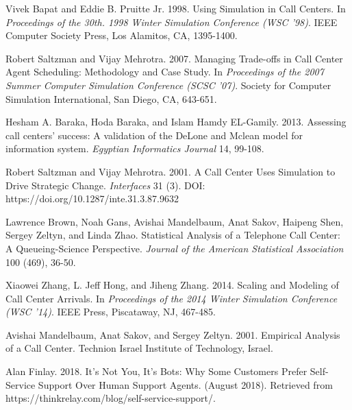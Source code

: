 \documentclass[12pt,twocolumn]{article}
\begin{document}
\newpage
\clearpage
{}
\begin{thebibliography}{8}
	
Vivek Bapat and Eddie B. Pruitte Jr. 1998. Using Simulation in Call Centers. In \textit{Proceedings of the 30th.  1998 Winter Simulation Conference (WSC ’98)}. IEEE Computer Society Press, Los Alamitos, CA, 1395-1400.

Robert Saltzman and Vijay Mehrotra. 2007. Managing Trade-offs in Call Center Agent Scheduling: Methodology and Case Study. In \textit{Proceedings of the 2007 Summer Computer Simulation Conference (SCSC ’07)}. Society for Computer Simulation International, San Diego, CA, 643-651.

Hesham A. Baraka, Hoda Baraka, and Islam Hamdy EL-Gamily. 2013. Assessing call centers’ success: A validation of the DeLone and Mclean model for information system. \textit{Egyptian Informatics Journal} 14, 99-108.

Robert Saltzman and Vijay Mehrotra. 2001. A Call Center Uses Simulation to Drive Strategic Change. \textit{Interfaces} 31 (3). DOI: https://doi.org/10.1287/inte.31.3.87.9632


Lawrence Brown, Noah Gans, Avishai Mandelbaum, Anat Sakov, Haipeng Shen, Sergey Zeltyn, and Linda Zhao. Statistical Analysis of a Telephone Call Center: A Queueing-Science Perspective. \textit{Journal of the American Statistical Association} 100 (469), 36-50.

Xiaowei Zhang, L. Jeff Hong, and Jiheng Zhang. 2014. Scaling and Modeling of Call Center Arrivals. In \textit{Proceedings of the 2014 Winter Simulation Conference (WSC ’14)}. IEEE Press, Piscataway, NJ, 467-485. 

Avishai Mandelbaum, Anat Sakov, and Sergey Zeltyn. 2001. Empirical Analysis of a Call Center. Technion Israel Institute of Technology, Israel. 

Alan Finlay. 2018. It’s Not You, It’s Bots: Why Some Customers Prefer Self-Service Support Over Human Support Agents. (August 2018). Retrieved from https://thinkrelay.com/blog/self-service-support/.

\end{thebibliography}
\end{document}
